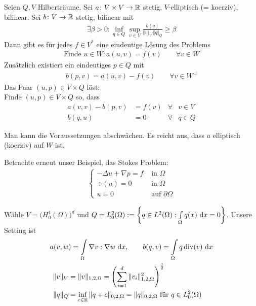 \setcounter{satz}{0} %
\begin{theorem}\label{theorem8.1}
	Seien $Q,V$ Hilberträume.	
	Sei $a\colon V\times V\to\mathbb{R}$ stetig, $V$-elliptisch (= koerziv), bilinear.
	Sei $b\colon V\to\mathbb{R}$ stetig, bilinear mit
	\begin{align*}
		\exists\beta>0:\inf\limits_{q\in Q}\sup\limits_{v\in V}\frac{b(q)}{\Vert v\Vert_V\cdot\Vert q\Vert_Q}\geq\beta
	\end{align*}
	Dann gibt es für jedes $f\in V^\ast$ eine eindeutige Lösung des Problems
	\begin{align*}
		\text{Finde }u\in W:a(u,v)=f(v)\qquad\forall v\in W
	\end{align*}
	Zusätzlich existiert ein eindeutiges $p\in Q$ mit
	\begin{align*}
		b(p,v)=a(u,v)-f(v)\qquad\forall v\in W^\perp
	\end{align*}
	Das Paar $(u,p)\in V\times Q$ löst:\\
	\tab Finde $(u,p)\in V\times Q$ so, dass
	\begin{align*}
		a(v,v)-b(p,v)&=f(v) &\forall& v\in V\\
		b(q,u)&=0 &\forall& q\in Q
	\end{align*}
\end{theorem}

\begin{bemerkung}
	Man kann die Voraussetzungen abschwächen. 
	Es reicht aus, dass $a$ elliptisch (koerziv) auf $W$ ist.
\end{bemerkung}

Betrachte erneut unser Beispiel, das Stokes Problem:
\begin{align*}
	\left\lbrace\begin{array}{rl}
		-\Delta u+\nabla p=f&\text{ in }\Omega\\
		\div(u)=0&\text{ in }\Omega\\
		u=0&\text{ auf }\partial\Omega
	\end{array}\right.
\end{align*}

Wähle $V=\big(H_0^1(\Omega)\big)^d$ und $Q=L_0^2(\Omega):=\left\lbrace q\in L^2(\Omega):\int\limits_\Omega q(x)\text{ d} x=0\right\rbrace$.
Unsere Setting ist
\begin{align*}
	a(v,w&)=\int\limits_\Omega\nabla v:\nabla w\text{ d} x,\qquad
	b(q,v)=\int\limits_\Omega q\operatorname{div}(v)\text{ d} x\\
	\Vert v\Vert_V&=\Vert v\Vert_{1,2,\Omega}=\left(\sum\limits_{i=1}^d\Vert v_i\Vert^2_{1,2,\Omega}\right)^{\frac{1}{2}}\\
	\Vert q\Vert_Q&=\inf\limits_{c\in\mathbb{R}}\Vert q+c\Vert_{0,2,\Omega}=\Vert q\Vert_{0,2,\Omega}\text{ für }q\in L^2_0(\Omega)
\end{align*}

